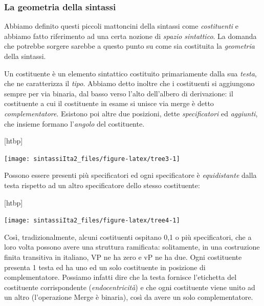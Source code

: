 \documentclass[a4paper,twoside,11pt,chapterprefix=false,bibliography=totocnumbered,listof=flat]{scrbook}
\makeatletter
\def\fps@figure{htbp}
\renewenvironment{figure}[1][\fps@figure]{
  \edef\@tempa{\noexpand\@float{figure}[#1]} 
  \@tempa
  \sffamily
}{
  \end@float
}
\makeatother
\begin{document}
\hypertarget{la-geometria-della-sintassi}{%
\subsubsection{La geometria della sintassi}\label{la-geometria-della-sintassi}}

Abbiamo definito questi piccoli mattoncini della sintassi come \emph{costituenti} e abbiamo fatto riferimento ad una certa nozione di \emph{spazio sintattico}. La domanda che potrebbe sorgere sarebbe a questo punto su come sia costituita la \emph{geometria} della sintassi.

Un costituente è un elemento sintattico costituito primariamente dalla sua \emph{testa}, che ne caratterizza il \emph{tipo}. Abbiamo detto inoltre che i costituenti si aggiungono sempre per via binaria, dal basso verso l'alto dell'albero di derivazione: il costituente a cui il costituente in esame si unisce via merge è detto \emph{complementatore}.
Esistono poi altre due posizioni, dette \emph{specificatori} ed \emph{aggiunti}, che insieme formano l'\emph{angolo} del costituente.

\begin{figure}

{\centering \texttt{[image: sintassiIta2\_files/figure-latex/tree3-1]} 

}

\caption{Raffigurazione di un costituente}\label{fig:tree3}
\end{figure}

Possono essere presenti più specificatori ed ogni specificatore è \emph{equidistante} dalla testa rispetto ad un altro specificatore dello stesso costituente:

\begin{figure}

{\centering \texttt{[image: sintassiIta2\_files/figure-latex/tree4-1]} 

}

\caption{Un costituente XP}\label{fig:tree4}
\end{figure}

Così, tradizionalmente, alcuni costituenti ospitano 0,1 o più specificatori, che a loro volta possono avere una struttura ramificata: solitamente, in una costruzione finita transitiva in italiano, VP ne ha zero e vP ne ha due.
Ogni costituente presenta 1 testa ed ha uno ed un solo costituente in posizione di complementatore.
Possiamo infatti dire che la testa fornisce l'etichetta del costituente corrispondente (\emph{endocentricità}) e che ogni costituente viene unito ad un altro (l'operazione Merge è binaria), così da avere un solo complementatore.
\end{document}
